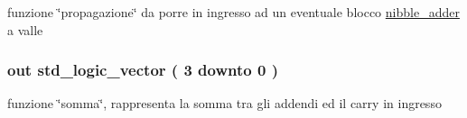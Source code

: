 funzione \char`\"{}propagazione\char`\"{} da porre in ingresso ad un eventuale blocco \hyperlink{classnibble__adder}{nibble\+\_\+adder} a valle 

\hypertarget{group___nibble_adder_gadfe538323c3296159dd3b383325a996b}{
\subsubsection[{sum}]{ {\bfseries \textcolor{vhdlchar}{out}\textcolor{vhdlchar}{ }} {\bfseries \textcolor{vhdlchar}{std\+\_\+logic\+\_\+vector}\textcolor{vhdlchar}{ }\textcolor{vhdlchar}{(}\textcolor{vhdlchar}{ }\textcolor{vhdlchar}{ } \textcolor{vhdldigit}{3} \textcolor{vhdlchar}{ }\textcolor{vhdlchar}{downto}\textcolor{vhdlchar}{ }\textcolor{vhdlchar}{ } \textcolor{vhdldigit}{0} \textcolor{vhdlchar}{ }\textcolor{vhdlchar}{)}\textcolor{vhdlchar}{ }} \hspace{0.3cm}{\ttfamily [Port]}}}\label{group___nibble_adder_gadfe538323c3296159dd3b383325a996b}


funzione \char`\"{}somma\char`\"{}, rappresenta la somma tra gli addendi ed il carry in ingresso 

